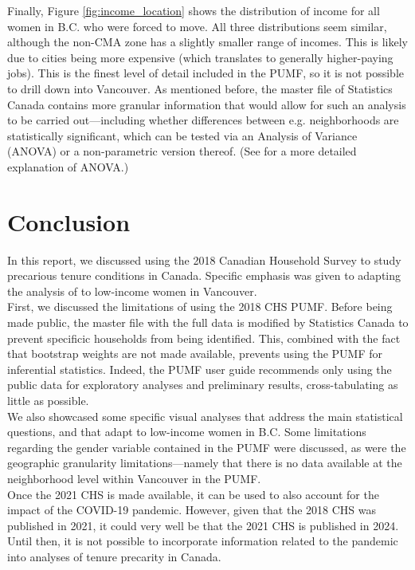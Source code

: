 \documentclass[11pt]{article}
\begin{document}
Finally, Figure \ref{fig:income_location} shows the distribution of income
for all women in B.C. who were forced to move. All three distributions seem
similar, although the non-CMA zone has a slightly smaller range of incomes.
This is likely due to cities being more expensive (which translates to
generally higher-paying jobs). This is the finest level of detail included
in the PUMF, so it is not possible to drill down into Vancouver. As mentioned
before, the master file of Statistics Canada contains more granular information
that would allow for such an analysis to be carried out---including whether
differences between e.g. neighborhoods are statistically significant, which
can be tested via an Analysis of Variance (ANOVA) or a non-parametric
version thereof.
(See \cite[Ch.~14]{agresti} for a more detailed explanation of ANOVA.)

\FloatBarrier

\section{Conclusion} \label{sec:conclusion}


In this report, we discussed using the 2018 Canadian Household Survey
to study precarious tenure conditions in Canada. Specific emphasis
was given to adapting the analysis of \cite{blog} to low-income women
in Vancouver.
\\

First, we discussed the limitations of using the 2018 CHS PUMF.
Before being made public, the master file with the full data
is modified by Statistics Canada to prevent specificic households
from being identified.
This, combined with the fact that bootstrap weights are not made
available, prevents using the PUMF for inferential statistics.
Indeed, the PUMF user guide recommends only using the public data
for exploratory analyses and preliminary results, cross-tabulating
as little as possible.
\\

We also showcased some specific visual analyses that address the main
statistical questions, and that adapt \cite{blog} to low-income women
in B.C. Some limitations regarding the gender variable contained in the
PUMF were discussed, as were the geographic granularity limitations---namely
that there is no data available at the neighborhood level within Vancouver in
the PUMF.
\\

Once the 2021 CHS is made available, it can be used to also account for
the impact of the COVID-19 pandemic. However, given that the 2018 CHS
was published in 2021, it could very well be that the 2021 CHS is
published in 2024. Until then, it is not possible to incorporate information
related to the pandemic into analyses of tenure precarity in Canada.


\clearpage


\end{document}
